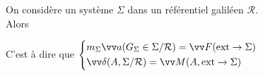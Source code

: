 ﻿\documentclass[a4paper]{article}
\begin{document}
\pagestyle{fancy}
\fancyhf{}
\setlength{\headheight}{15pt}

\begin{center}
	\large{}
\end{center}


On considère un système \( \Sigma \) dans un référentiel galiléen \( \mathcal R \). \\
Alors
\begin{center}
\end{center}
C'est à dire que \( \left\{ \begin{array}{@{}l} m_\Sigma \vv a(G_\Sigma \in\Sigma / \mathcal R) = \vv F(\mathrm{ext}\rightarrow\Sigma) \\[3pt] \vv\delta(A,\Sigma / \mathcal R) = \vv M(A, \mathrm{ext}\rightarrow\Sigma) \end{array}\right. \)
\end{document}
